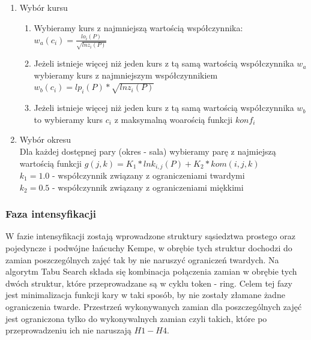 \begin{enumerate}
  \item Wybór kursu 
  \begin{enumerate}
    \item Wybieramy kurs z najmniejszą wartością współczynnika:\\
     $ w_a(c_{i}) = \frac{lo_{i}(P)}{\sqrt{lnz_{i}(P)}}$
    \item Jeżeli istnieje więcej niż jeden kurs z tą samą wartością współczynnika ${w_a}$ wybieramy kurs z najmniejszym współczynnikiem \\ $ w_b(c_{i}) = lp_{i}(P) * \sqrt{lnz_{i}(P)} $
    \item Jeżeli istnieje więcej niż jeden kurs z tą samą wartością współczynnika $w_b$ to wybieramy kurs ${c_{i}}$ z maksymalną woarością funkcji $konf_{i}$
 
  \end{enumerate}
  \item Wybór okresu \\
  Dla każdej dostępnej pary (okres - sala) wybieramy parę z najmiejszą wartością funkcji $g(j, k) = K_{1} * lnk_{i,j}(P) + K_{2} * kom(i, j, k)$ \\
  $k_{1} = 1.0 $ - współczynnik związany z ograniczeniami twardymi \\
  $k_{2} = 0.5 $ - współczynnik związany z ograniczeniami miękkimi
\end{enumerate}



\subsubsection{Faza intensyfikacji}
\par W fazie intensyfikacji zostają wprowadzone struktury sąsiedztwa prostego oraz pojedyncze i podwójne łańcuchy Kempe, w obrębie tych struktur dochodzi do zamian poszczególnych zajęć tak by nie naruszyć ograniczeń twardych. Na algorytm Tabu Search składa się kombinacja połączenia zamian w obrębie tych dwóch struktur, które przeprowadzane są w cyklu token - ring. Celem tej fazy jest minimalizacja funkcji kary w taki sposób, by nie zostały złamane żadne ograniczenia twarde. Przestrzeń wykonywanych zamian dla poszczególnych zajęć jest ograniczona tylko do wykonywalnych zamian czyli takich, które po przeprowadzeniu ich nie naruszają ${H1-H4}$.
